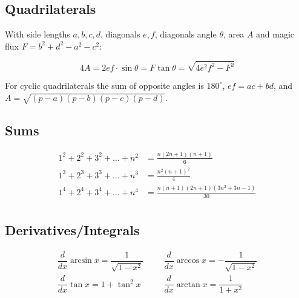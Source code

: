     \subsection{Quadrilaterals}
    With side lengths $a,b,c,d$, diagonals $e, f$, diagonals angle $\theta$, area $A$ and
    magic flux $F=b^2+d^2-a^2-c^2$:
    
    \[ 4A = 2ef \cdot \sin\theta = F\tan\theta = \sqrt{4e^2f^2-F^2} \]
    
     For cyclic quadrilaterals the sum of opposite angles is $180^\circ$,
    $ef = ac + bd$, and $A = \sqrt{(p-a)(p-b)(p-c)(p-d)}$.
    
    
   
    
    
    
    \subsection{Sums}
        \begin{align*}
            1^2 + 2^2 + 3^2 + \dots + n^2 &= \frac{n(2n+1)(n+1)}{6} \\
            1^3 + 2^3 + 3^3 + \dots + n^3 &= \frac{n^2(n+1)^2}{4} \\
            1^4 + 2^4 + 3^4 + \dots + n^4 &= \frac{n(n+1)(2n+1)(3n^2 + 3n - 1)}{30} \\
        \end{align*}
    \subsection{Derivatives/Integrals}
    \begin{align*}
        \dfrac{d}{dx}\arcsin x = \dfrac{1}{\sqrt{1-x^2}} &&& \dfrac{d}{dx}\arccos x = -\dfrac{1}{\sqrt{1-x^2}} \\
        \dfrac{d}{dx}\tan x = 1+\tan^2 x &&& \dfrac{d}{dx}\arctan x = \dfrac{1}{1+x^2} \\
    \end{align*}
    
